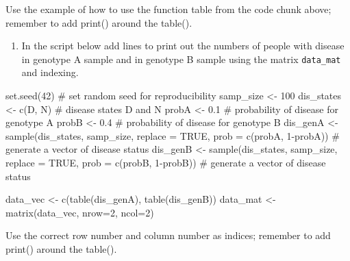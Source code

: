 \documentclass[
  letterpaper,
  DIV=11,
  numbers=noendperiod]{scrreprt}
\newenvironment{Shaded}{\begin{snugshade}}{\end{snugshade}}
\newcommand{\NormalTok}[1]{\textcolor[rgb]{0.00,0.23,0.31}{#1}}
\providecommand{\tightlist}{%
  \setlength{\itemsep}{0pt}\setlength{\parskip}{0pt}}\usepackage{longtable,booktabs,array}
\begin{document}
\begin{tcolorbox}[enhanced jigsaw, arc=.35mm, colframe=quarto-callout-caution-color-frame, left=2mm, opacitybacktitle=0.6, breakable, title=\textcolor{quarto-callout-caution-color}{\faFire}\hspace{0.5em}{Hint}, toprule=.15mm, coltitle=black, bottomtitle=1mm, toptitle=1mm, colback=white, leftrule=.75mm, colbacktitle=quarto-callout-caution-color!10!white, titlerule=0mm, opacityback=0, rightrule=.15mm, bottomrule=.15mm]

Use the example of how to use the function table from the code chunk
above; remember to add print() around the table().

\end{tcolorbox}

\begin{enumerate}
\def\labelenumi{\arabic{enumi}.}
\setcounter{enumi}{1}
\tightlist
\item
  In the script below add lines to print out the numbers of people with
  disease in genotype A sample and in genotype B sample using the matrix
  \texttt{data\_mat} and indexing.
\end{enumerate}

\begin{Shaded}
\begin{Highlighting}[]
\NormalTok{set.seed(42) \# set random seed for reproducibility}
\NormalTok{samp\_size \textless{}{-} 100 }
\NormalTok{dis\_states \textless{}{-} c(\textquotesingle{}D\textquotesingle{}, \textquotesingle{}N\textquotesingle{}) \# disease states \textquotesingle{}D\textquotesingle{} and \textquotesingle{}N\textquotesingle{}}
\NormalTok{probA \textless{}{-} 0.1 \# probability of disease for genotype A}
\NormalTok{probB \textless{}{-} 0.4 \# probability of disease for genotype B}
\NormalTok{dis\_genA \textless{}{-} sample(dis\_states, samp\_size, replace = TRUE, prob = c(probA, 1{-}probA)) \# generate a vector of disease status}
\NormalTok{dis\_genB \textless{}{-} sample(dis\_states, samp\_size, replace = TRUE, prob = c(probB, 1{-}probB)) \# generate a vector of disease status}

\NormalTok{data\_vec \textless{}{-} c(table(dis\_genA), table(dis\_genB))}
\NormalTok{data\_mat \textless{}{-} matrix(data\_vec, nrow=2, ncol=2)}

\end{Highlighting}
\end{Shaded}

\begin{tcolorbox}[enhanced jigsaw, arc=.35mm, colframe=quarto-callout-caution-color-frame, left=2mm, opacitybacktitle=0.6, breakable, title=\textcolor{quarto-callout-caution-color}{\faFire}\hspace{0.5em}{Hint}, toprule=.15mm, coltitle=black, bottomtitle=1mm, toptitle=1mm, colback=white, leftrule=.75mm, colbacktitle=quarto-callout-caution-color!10!white, titlerule=0mm, opacityback=0, rightrule=.15mm, bottomrule=.15mm]

Use the correct row number and column number as indices; remember to add
print() around the table().

\end{tcolorbox}
\end{document}
